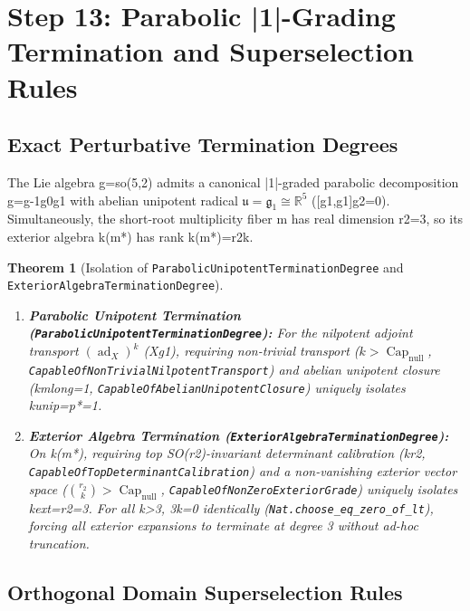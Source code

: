 \documentclass[11pt,reqno]{amsart}
\newtheorem{theorem}{Theorem}[section]
\theoremstyle{definition}
\theoremstyle{remark}
\newcommand{\CapNull}{\operatorname{Cap}_{\mathrm{null}}}
\newcommand{\ad}{\operatorname{ad}}
\begin{document}
\section{Step 13: Parabolic \texorpdfstring{|1|}{|1|}-Grading Termination and Superselection Rules}

\subsection{Exact Perturbative Termination Degrees}

The Lie algebra g=so(5,2) admits a canonical |1|-graded parabolic decomposition g=g-1g0g1 with abelian unipotent radical $\mathfrak{u} = \mathfrak{g}_1 \cong \mathbb{R}^5$ ([g1,g1]g2={0}). Simultaneously, the short-root multiplicity fiber m has real dimension r2=3, so its exterior algebra k(m*) has rank k(m*)=r2k.

\begin{theorem}[Isolation of \texttt{ParabolicUnipotentTerminationDegree} and \texttt{ExteriorAlgebraTerminationDegree}]
\label{thm:termination_degrees}
\begin{enumerate}[label=(\roman*)]
  \item \textbf{Parabolic Unipotent Termination (\texttt{ParabolicUnipotentTerminationDegree}):} For the nilpotent adjoint transport $(\ad_X)^k$ (Xg1), requiring non-trivial transport ($k > \CapNull$, \texttt{CapableOfNonTrivialNilpotentTransport}) and abelian unipotent closure (kmlong=1, \texttt{CapableOfAbelianUnipotentClosure}) uniquely isolates kunip=p*=1.
  \item \textbf{Exterior Algebra Termination (\texttt{ExteriorAlgebraTerminationDegree}):} On k(m*), requiring top SO(r2)-invariant determinant calibration (kr2, \texttt{CapableOfTopDeterminantCalibration}) and a non-vanishing exterior vector space ($\binom{r_2}{k} > \CapNull$, \texttt{CapableOfNonZeroExteriorGrade}) uniquely isolates kext=r2=3. For all k>3, 3k=0 identically (\texttt{Nat.choose\_eq\_zero\_of\_lt}), forcing all exterior expansions to terminate at degree 3 without ad-hoc truncation.
\end{enumerate}
\end{theorem}

\subsection{Orthogonal Domain Superselection Rules}
\end{document}
